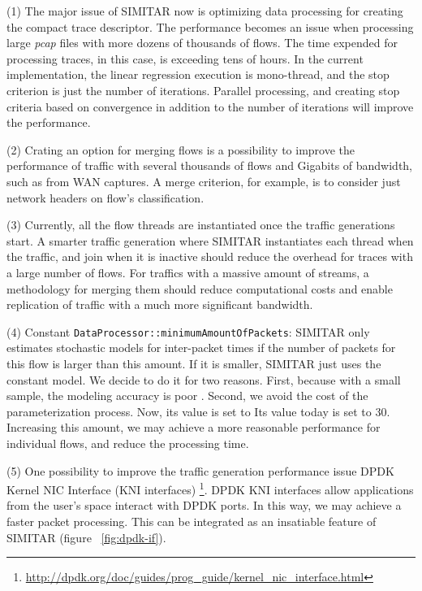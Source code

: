 (1) The major issue of SIMITAR now is optimizing data processing for creating the compact trace descriptor. The performance becomes an issue when processing large \textit{pcap} files with more dozens of thousands of flows. The time expended for processing traces, in this case, is exceeding tens of hours. In the current implementation, the linear regression execution is mono-thread, and the stop criterion is just the number of iterations. Parallel processing, and creating stop criteria based on convergence in addition to the number of iterations will improve the performance. 

(2) Crating an option for merging flows is a possibility to improve the performance of traffic with several thousands of flows and Gigabits of bandwidth, such as from WAN captures. A merge criterion, for example, is to consider just network headers on flow's classification.


(3) Currently, all the flow threads are instantiated once the traffic generations start. A smarter traffic generation where SIMITAR instantiates each thread when the traffic, and join when it is inactive should reduce the overhead for traces with a large number of flows. For traffics with a massive amount of streams, a methodology for merging them should reduce computational costs and enable replication of traffic with a much more significant bandwidth. 


(4) Constant \texttt{DataProcessor::minimumAmountOfPackets}: SIMITAR only estimates stochastic models for inter-packet times if the number of packets for this flow is larger than this amount. If it is smaller, SIMITAR just uses the constant model. We decide to do it for two reasons. First, because with a small sample, the modeling accuracy is poor . Second, we avoid the cost of the parameterization process. Now, its value is set to Its value today is set to 30. Increasing this amount, we may achieve a more reasonable performance for individual flows, and reduce the processing time. 


(5) One possibility to improve the traffic generation performance issue DPDK Kernel NIC Interface  (KNI interfaces) \footnote{\href{http://dpdk.org/doc/guides/prog_guide/kernel_nic_interface.html}{http://dpdk.org/doc/guides/prog\_guide/kernel\_nic\_interface.html}}. DPDK KNI interfaces allow applications from the user's space interact with DPDK ports. In this way, we may achieve a faster packet processing. This can be integrated as an insatiable feature of SIMITAR (figure ~\ref{fig:dpdk-if}).


